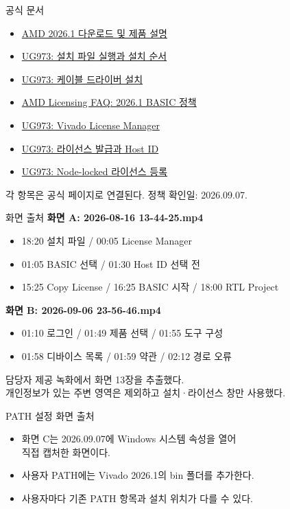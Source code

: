 \documentclass[aspectratio=43,11pt]{beamer}
\begin{document}
\begin{frame}{공식 문서}
\small
\begin{itemize}
\item \href{https://www.amd.com/en/support/downloads/adaptive-socs-and-fpgas/development-tools/2026-1.html}{AMD 2026.1 다운로드 및 제품 설명}
\item \href{https://docs.amd.com/r/en-US/ug973-vivado-release-notes-install-license/Run-the-Installation-File}{UG973: 설치 파일 실행과 설치 순서}
\item \href{https://docs.amd.com/r/en-US/ug973-vivado-release-notes-install-license/Install-Cable-Drivers}{UG973: 케이블 드라이버 설치}
\item \href{https://www.amd.com/en/products/software/adaptive-socs-and-fpgas/licensing-faq.html}{AMD Licensing FAQ: 2026.1 BASIC 정책}
\item \href{https://docs.amd.com/r/en-US/ug973-vivado-release-notes-install-license/Managing-Licenses-with-the-Vivado-License-Manager}{UG973: Vivado License Manager}
\item \href{https://docs.amd.com/r/en-US/ug973-vivado-release-notes-install-license/Create-and-Generate-a-License-Key-File}{UG973: 라이선스 발급과 Host ID}
\item \href{https://docs.amd.com/r/en-US/ug973-vivado-release-notes-install-license/Install-Certificate-Based-Node-Locked-License-Key-File}{UG973: Node-locked 라이선스 등록}
\end{itemize}
\vspace{0.2cm}
각 항목은 공식 페이지로 연결된다. 정책 확인일: 2026.09.07.
\end{frame}

\begin{frame}{화면 출처}
\small
\textbf{화면 A: 2026-08-16 13-44-25.mp4}
\begin{itemize}
\item 18:20 설치 파일 / 00:05 License Manager
\item 01:05 BASIC 선택 / 01:30 Host ID 선택 전
\item 15:25 Copy License / 16:25 BASIC 시작 / 18:00 RTL Project
\end{itemize}
\vspace{0.15cm}
\textbf{화면 B: 2026-09-06 23-56-46.mp4}
\begin{itemize}
\item 01:10 로그인 / 01:49 제품 선택 / 01:55 도구 구성
\item 01:58 디바이스 목록 / 01:59 약관 / 02:12 경로 오류
\end{itemize}
\vspace{0.15cm}
{\footnotesize 담당자 제공 녹화에서 화면 13장을 추출했다.\\
개인정보가 있는 주변 영역은 제외하고 설치·라이선스 창만 사용했다.}
\end{frame}

\begin{frame}{PATH 설정 화면 출처}
\begin{itemize}
\item 화면 C는 2026.09.07에 Windows 시스템 속성을 열어\\
직접 캡처한 화면이다.
\item 사용자 PATH에는 Vivado 2026.1의 bin 폴더를 추가한다.
\item 사용자마다 기존 PATH 항목과 설치 위치가 다를 수 있다.
\end{itemize}
\end{frame}
\end{document}

